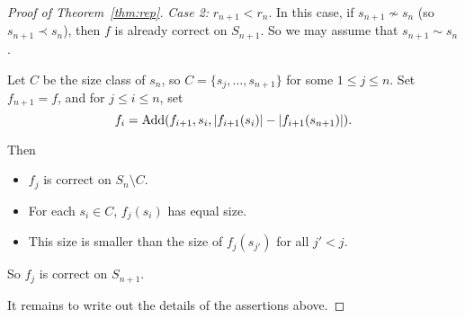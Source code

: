 \documentclass[12pt]{article}
\theoremstyle{definition}
\begin{document}
\begin{proof}[Proof of Theorem~\ref{thm:rep}]
\emph{Case 2:} $r_{n+1} < r_n$. In this case, if $s_{n+1}\not\sim s_n$ (so $s_{n+1} \prec s_n$), then $f$ is already correct on $S_{n+1}$. So we may assume that $s_{n+1}\sim s_n$. 

Let $C$ be the size class of $s_n$, so $C = \{s_j,\dots,s_{n+1}\}$ for some $1\leq j \leq n$. 
Set $f_{n+1} = f$, and for $j\leq i \leq n$, set $$f_i = \text{Add}(f_{i+1}, s_i, |f_{i+1}(s_i)| - |f_{i+1}(s_{n+1})|).$$

Then 
\begin{itemize}
    \item $f_j$ is correct on $S_n\setminus C$.
    \item For each $s_i\in C$, $f_j(s_i)$ has equal size.
    \item This size is smaller than the size of $f_j(s_{j'})$ for all $j'<j$. 
\end{itemize}
So $f_j$ is correct on $S_{n+1}$. 

It remains to write out the details of the assertions above. 
\end{proof}
\end{document}
